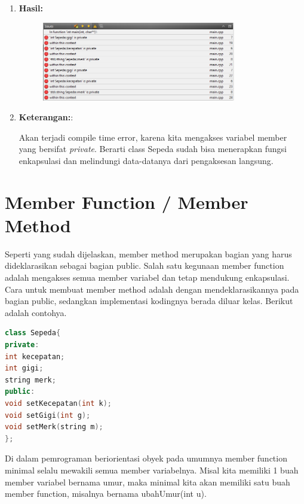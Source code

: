 \begin{enumerate}
\item 	\textbf{Hasil:}
	
	\begin{figure}[htbp]
		\centering
		\includegraphics[width=0.8\textwidth]{images/capture6-1.png}

	\end{figure}
	
\item 	\textbf{Keterangan:}:
	
	Akan terjadi compile time error, karena kita mengakses variabel member
	yang bersifat \emph{private}. Berarti class Sepeda sudah bisa menerapkan
	fungsi enkapsulasi dan melindungi data-datanya dari pengaksesan
	langsung.
\end{enumerate}




\section{Member Function / Member
Method}\label{member-function-member-method}

Seperti yang sudah dijelaskan, member method merupakan bagian yang harus
dideklarasikan sebagai bagian public. Salah satu kegunaan member
function adalah mengakses semua member variabel dan tetap mendukung
enkapsulasi. Cara untuk membuat member method adalah dengan
mendeklarasikannya pada bagian public, sedangkan implementasi kodingnya
berada diluar kelas. Berikut adalah contohya.

\begin{lstlisting}[language=c++]
class Sepeda{
private:
int kecepatan;
int gigi;
string merk;
public:
void setKecepatan(int k);
void setGigi(int g);
void setMerk(string m);
};
\end{lstlisting}

Di dalam pemrograman beriorientasi obyek pada umumnya member function
minimal selalu mewakili semua member variabelnya. Misal kita memiliki 1
buah member variabel bernama umur, maka minimal kita akan memiliki satu
buah member function, misalnya bernama ubahUmur(int u).

